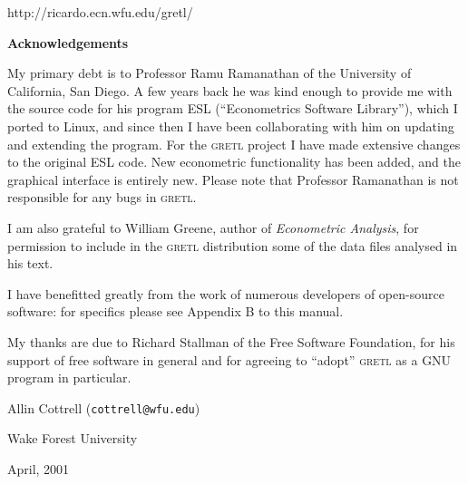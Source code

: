 \documentclass{article}
\begin{document}
\vspace{.2in}
\begin{center}
  \textsf{\large http://ricardo.ecn.wfu.edu/gretl/}
\end{center}

\clearpage

\thispagestyle{empty}

\vspace*{1in}

\begin{center}
  {\large \bf Acknowledgements}
\end{center}

\vspace{12pt}

\noindent
My primary debt is to Professor Ramu Ramanathan of the University of
California, San Diego.  A few years back he was kind enough to provide
me with the source code for his program ESL (``Econometrics Software
Library''), which I ported to Linux, and since then I have been
collaborating with him on updating and extending the program.  For the
\textsc{gretl} project I have made extensive changes to the original
ESL code.  New econometric functionality has been added, and the
graphical interface is entirely new.  Please note that Professor
Ramanathan is not responsible for any bugs in \textsc{gretl}.

I am also grateful to William Greene, author of \textit{Econometric
  Analysis}, for permission to include in the \textsc{gretl}
distribution some of the data files analysed in his text.

I have benefitted greatly from the work of numerous developers of
open-source software: for specifics please see Appendix B to this
manual.

My thanks are due to Richard Stallman of the Free Software Foundation,
for his support of free software in general and for agreeing to
``adopt'' \textsc{gretl} as a GNU program in particular.

\vspace{.2in}
\hspace{.5\textwidth} Allin Cottrell (\texttt{cottrell@wfu.edu})\par
\hspace{.5\textwidth} Wake Forest University\par
\hspace{.5\textwidth} April, 2001\par

\clearpage

\tableofcontents
\end{document}
